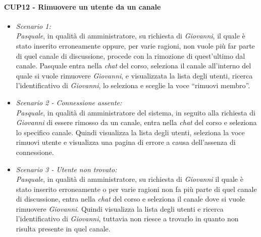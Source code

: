 \paragraph{CUP12 - Rimuovere un utente da un canale \\}
\begin{itemize}
	\item \textit{Scenario 1:\\}
	\textit{Pasquale}, in qualità di amministratore, su richiesta di \textit{Giovanni}, il quale è stato inserito erroneamente oppure, per varie ragioni, non vuole più far parte di quel canale di discussione, procede con la rimozione di quest’ultimo dal canale.
	Pasquale entra nella \textit{chat} del corso, seleziona il canale all’interno del quale si vuole rimuovere \textit{Giovanni}, e visualizzata la lista degli utenti, ricerca l’identificativo di \textit{Giovanni}, lo seleziona e sceglie la voce “rimuovi membro”.\\
	
	\item \textit{Scenario 2 - Connessione assente:\\}
	\textit{Pasquale}, in qualità di amministratore del sistema, in seguito alla richiesta di \textit{Giovanni} di essere rimosso da un canale,  entra nella \textit{chat} del corso e seleziona lo specifico canale. Quindi visualizza la lista degli utenti, seleziona la voce rimuovi utente e
	visualizza una pagina di errore a causa dell’assenza di connessione.\\
	
	\item \textit{Scenario 3 - Utente non trovato:\\}
	\textit{Pasquale}, in qualità di amministratore, su richiesta di \textit{Giovanni} il quale è stato inserito erroneamente o per varie ragioni non fa più parte di quel canale di discussione, entra nella \textit{chat} del corso e seleziona il canale dove si vuole rimuovere \textit{Giovanni}. Quindi visualizza la lista degli utenti e ricerca l’identificativo di \textit{Giovanni}, tuttavia non riesce a trovarlo in quanto non risulta presente in quel canale.\\
\end{itemize}


